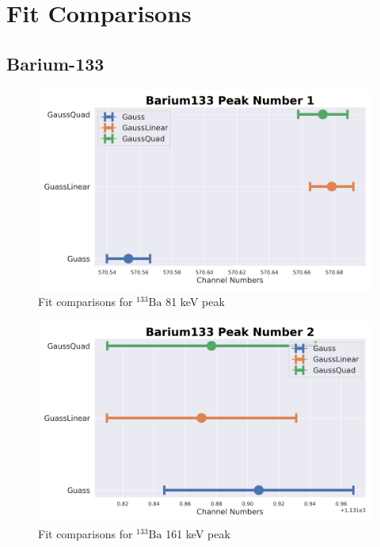 \documentclass[11pt,a4paper]{article}
\newcommand{\element}[2]{$^{#2}\textrm{#1}$}
\begin{document}
\clearpage

\section{Fit Comparisons}
\subsection{Barium-133}

\begin{figure}[H]
  \centering
  \includegraphics[width=0.95\linewidth]{./Images/Barium133/FitComparison_Peak1.png}
  \caption{Fit comparisons for \element{Ba}{133} 81 keV peak}
\end{figure}

\begin{figure}[H]
  \centering
  \includegraphics[width=0.95\linewidth]{./Images/Barium133/FitComparison_Peak2.png}
  \caption{Fit comparisons for \element{Ba}{133} 161 keV peak}
\end{figure}
\end{document}
